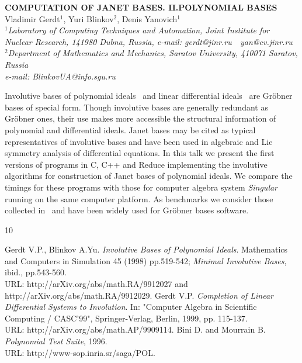 \documentclass[11pt, draft]{article}
\begin{document}

\begin{center}
{\bf
COMPUTATION OF JANET BASES. II.POLYNOMIAL BASES}\\
\vspace {0.3cm}
{Vladimir Gerdt$^1$, Yuri Blinkov$^2$, Denis Yanovich$^1$}\\
{\it \small$^1$Laboratory of Computing Techniques and Automation, Joint Institute for Nuclear
Research, 141980 Dubna, Russia, e-mail: gerdt@jinr.ru\ \ yan@cv.jinr.ru \\
$^2$Department of Mathematics and Mechanics, Saratov University, 410071 Saratov, Russia
\\ e-mail: BlinkovUA@info.sgu.ru}
\end{center}
\vspace {1.0cm}
Involutive bases of polynomial ideals~\cite{GB} and linear differential
ideals~\cite{G99} are Gr\"{o}bner bases of special form. Though involutive
bases are generally redundant as Gr\"{o}bner ones, their use makes
more accessible the structural information of polynomial and
differential ideals. Janet bases may be cited as typical representatives
of involutive bases and have been used in algebraic and Lie symmetry
analysis of differential equations. In this talk we present the first
versions of programs in C, C++ and Reduce implementing the involutive
algorithms for construction of Janet bases of polynomial ideals. We compare the
timings for these programs with those for computer algebra system
{\em Singular} running on the same computer platform. As benchmarks
we consider those collected in~\cite{BM} and have been widely used for
Gr\"{o}bner bases software.
\vskip 0.5cm

\begin{thebibliography}{10}

 Gerdt V.P., Blinkov A.Yu. {\em Involutive Bases of Polynomial
    Ideals}. Mathematics and Computers in Simulation 45 (1998)
    pp.519-542; {\em Minimal Involutive Bases}, ibid., pp.543-560. \\
    URL: http://arXiv.org/abs/math.RA/9912027
    and http://arXiv.org/abs/math.RA/9912029.
 Gerdt V.P. {\em Completion of Linear Differential Systems to
    Involution}. In: "Computer Algebra in Scientific Computing
    / CASC'99", Springer-Verlag, Berlin, 1999, pp. 115-137. \\
    URL: http://arXiv.org/abs/math.AP/9909114.
 Bini D. and Mourrain B. {\em Polynomial Test Suite}, 1996. \\
    URL: http://www-sop.inria.sr/saga/POL.

\end{thebibliography}
\end{document}
